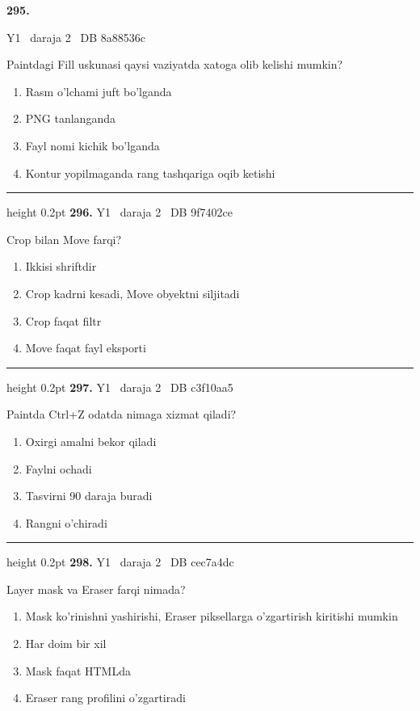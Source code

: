 \documentclass[10pt,a4paper,oneside]{article}
\begin{document}
\hypertarget{q295}{\textbf{\color{ink}295.}}  {\color{muted}\scriptsize Y1 \textbullet\ daraja 2 \textbullet\ DB 8a88536c}
\par
Paintdagi Fill uskunasi qaysi vaziyatda xatoga olib kelishi mumkin?
\begin{enumerate}[label=\Alph*),leftmargin=9mm]
\item Rasm o'lchami juft bo'lganda
\item PNG tanlanganda
\item Fayl nomi kichik bo'lganda
\item Kontur yopilmaganda rang tashqariga oqib ketishi
\end{enumerate}
\vspace{2mm}\hrule height 0.2pt \vspace{4mm}
\hypertarget{q296}{\textbf{\color{ink}296.}}  {\color{muted}\scriptsize Y1 \textbullet\ daraja 2 \textbullet\ DB 9f7402ce}
\par
Crop bilan Move farqi?
\begin{enumerate}[label=\Alph*),leftmargin=9mm]
\item Ikkisi shriftdir
\item Crop kadrni kesadi, Move obyektni siljitadi
\item Crop faqat filtr
\item Move faqat fayl eksporti
\end{enumerate}
\vspace{2mm}\hrule height 0.2pt \vspace{4mm}
\hypertarget{q297}{\textbf{\color{ink}297.}}  {\color{muted}\scriptsize Y1 \textbullet\ daraja 2 \textbullet\ DB c3f10aa5}
\par
Paintda Ctrl+Z odatda nimaga xizmat qiladi?
\begin{enumerate}[label=\Alph*),leftmargin=9mm]
\item Oxirgi amalni bekor qiladi
\item Faylni ochadi
\item Tasvirni 90 daraja buradi
\item Rangni o'chiradi
\end{enumerate}
\vspace{2mm}\hrule height 0.2pt \vspace{4mm}
\hypertarget{q298}{\textbf{\color{ink}298.}}  {\color{muted}\scriptsize Y1 \textbullet\ daraja 2 \textbullet\ DB cec7a4dc}
\par
Layer mask va Eraser farqi nimada?
\begin{enumerate}[label=\Alph*),leftmargin=9mm]
\item Mask ko'rinishni yashirishi, Eraser piksellarga o'zgartirish kiritishi mumkin
\item Har doim bir xil
\item Mask faqat HTMLda
\item Eraser rang profilini o'zgartiradi
\end{enumerate}
\end{document}
